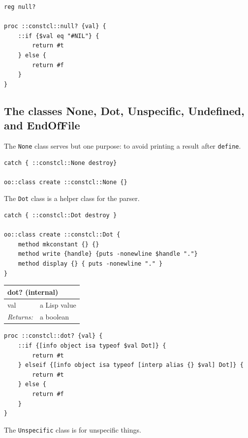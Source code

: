 \documentclass[twoside,9pt]{report}
\begin{document}
\noindent\makebox[\linewidth]{\rule{\linewidth}{0.4pt}}
\begin{lstlisting}
reg null?
 
proc ::constcl::null? {val} {
    ::if {$val eq "#NIL"} {
        return #t
    } else {
        return #f
    }
}
\end{lstlisting}
\noindent\makebox[\linewidth]{\rule{\linewidth}{0.4pt}}
\subsection{The classes None, Dot, Unspecific, Undefined, and EndOfFile}
\label{the-classes-none,-dot,-unspecific,-undefined,-and-endoffile}

The \texttt{None} class serves but one purpose: to avoid printing a result after \texttt{define}.

\noindent\makebox[\linewidth]{\rule{\linewidth}{0.4pt}}
\begin{lstlisting}
catch { ::constcl::None destroy}
 
oo::class create ::constcl::None {}
\end{lstlisting}
\noindent\makebox[\linewidth]{\rule{\linewidth}{0.4pt}}

The \texttt{Dot} class is a helper class for the parser.

\noindent\makebox[\linewidth]{\rule{\linewidth}{0.4pt}}
\begin{lstlisting}
catch { ::constcl::Dot destroy }
 
oo::class create ::constcl::Dot {
    method mkconstant {} {}
    method write {handle} {puts -nonewline $handle "."}
    method display {} { puts -nonewline "." }
}
\end{lstlisting}
\noindent\makebox[\linewidth]{\rule{\linewidth}{0.4pt}}
\begin{tabular}{ |l l| }
\hline
\multicolumn{2}{|l|}{dot? (internal)} \\
\hline
val & a Lisp value \\
\textit{Returns:} & a boolean \\
\hline
\end{tabular}

\noindent\makebox[\linewidth]{\rule{\linewidth}{0.4pt}}
\begin{lstlisting}
proc ::constcl::dot? {val} {
    ::if {[info object isa typeof $val Dot]} {
        return #t
    } elseif {[info object isa typeof [interp alias {} $val] Dot]} {
        return #t
    } else {
        return #f
    }
}
\end{lstlisting}
\noindent\makebox[\linewidth]{\rule{\linewidth}{0.4pt}}

The \texttt{Unspecific} class is for unspecific things.
\end{document}
